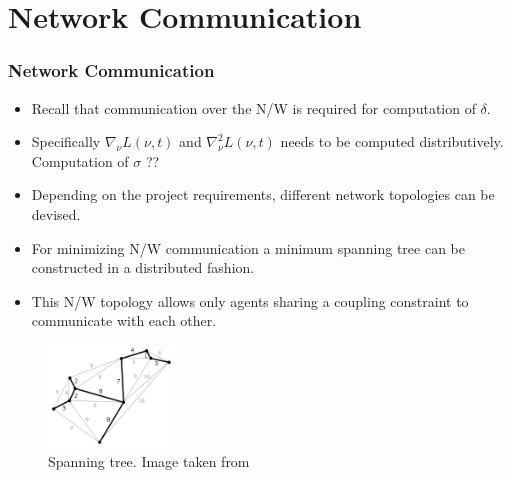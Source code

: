 \documentclass{beamer}
\newcommand\FontviTen{\fontsize{10}{7.2}\selectfont}
\begin{document}
\section{Network Communication}
\begin{frame}
\frametitle{Network Communication}
\FontviTen
\begin{itemize}
\item Recall that communication over the N/W is required for computation of $\delta$.
\item Specifically $\nabla_{\nu}L(\nu,t)$ and $\nabla_{\nu}^2 L(\nu,t)$ needs to be computed distributively. Computation of $\sigma$ ??
\item Depending on the project requirements, different network topologies can be devised. 
\item For minimizing N/W communication a minimum spanning tree can be constructed in a distributed fashion.
\item This N/W topology allows only agents sharing a coupling constraint to communicate with each other.
\end{itemize}
\begin{figure}
\centering
    \includegraphics[width = 0.3\textwidth]{Minimum_spanning_tree.png}
    \caption{Spanning tree. Image taken from \cite{p2}}
\end{figure}
\end{frame}
\end{document}
